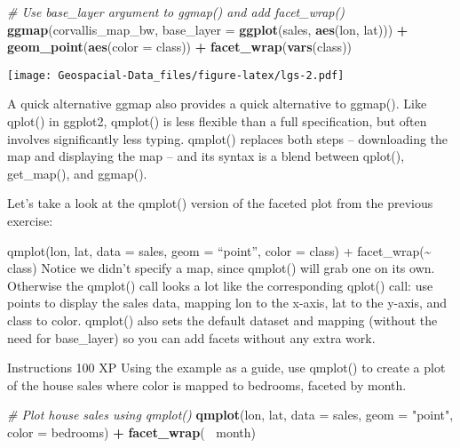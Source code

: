 \documentclass[]{article}
\newenvironment{Shaded}{\begin{snugshade}}{\end{snugshade}}
\newcommand{\CommentTok}[1]{\textcolor[rgb]{0.56,0.35,0.01}{\textit{#1}}}
\newcommand{\DataTypeTok}[1]{\textcolor[rgb]{0.13,0.29,0.53}{#1}}
\newcommand{\KeywordTok}[1]{\textcolor[rgb]{0.13,0.29,0.53}{\textbf{#1}}}
\newcommand{\NormalTok}[1]{#1}
\newcommand{\OperatorTok}[1]{\textcolor[rgb]{0.81,0.36,0.00}{\textbf{#1}}}
\newcommand{\StringTok}[1]{\textcolor[rgb]{0.31,0.60,0.02}{#1}}
\begin{document}
\begin{Shaded}
\begin{Highlighting}[]
\CommentTok{# Use base_layer argument to ggmap() and add facet_wrap()}
  \KeywordTok{ggmap}\NormalTok{(corvallis_map_bw, }
    \DataTypeTok{base_layer =} \KeywordTok{ggplot}\NormalTok{(sales, }\KeywordTok{aes}\NormalTok{(lon, lat))) }\OperatorTok{+}
\StringTok{  }\KeywordTok{geom_point}\NormalTok{(}\KeywordTok{aes}\NormalTok{(}\DataTypeTok{color =}\NormalTok{ class)) }\OperatorTok{+}
\StringTok{  }\KeywordTok{facet_wrap}\NormalTok{(}\KeywordTok{vars}\NormalTok{(class))}
\end{Highlighting}
\end{Shaded}

\texttt{[image: Geospacial-Data\_files/figure-latex/lgs-2.pdf]}

A quick alternative ggmap also provides a quick alternative to ggmap().
Like qplot() in ggplot2, qmplot() is less flexible than a full
specification, but often involves significantly less typing. qmplot()
replaces both steps -- downloading the map and displaying the map -- and
its syntax is a blend between qplot(), get\_map(), and ggmap().

Let's take a look at the qmplot() version of the faceted plot from the
previous exercise:

qmplot(lon, lat, data = sales, geom = ``point'', color = class) +
facet\_wrap(\textasciitilde{} class) Notice we didn't specify a map,
since qmplot() will grab one on its own. Otherwise the qmplot() call
looks a lot like the corresponding qplot() call: use points to display
the sales data, mapping lon to the x-axis, lat to the y-axis, and class
to color. qmplot() also sets the default dataset and mapping (without
the need for base\_layer) so you can add facets without any extra work.

Instructions 100 XP Using the example as a guide, use qmplot() to create
a plot of the house sales where color is mapped to bedrooms, faceted by
month.

\begin{Shaded}
\begin{Highlighting}[]
\CommentTok{# Plot house sales using qmplot()}
\KeywordTok{qmplot}\NormalTok{(lon, lat, }\DataTypeTok{data =}\NormalTok{ sales, }
       \DataTypeTok{geom =} \StringTok{"point"}\NormalTok{, }\DataTypeTok{color =}\NormalTok{ bedrooms) }\OperatorTok{+}
\StringTok{  }\KeywordTok{facet_wrap}\NormalTok{(}\OperatorTok{~}\StringTok{ }\NormalTok{month)}
\end{Highlighting}
\end{Shaded}
\end{document}
